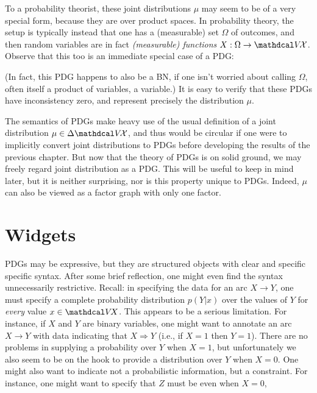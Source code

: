 To a probability theorist, these joint distributions $\mu$ may seem to be of a very special form, because they are over product spaces. 
In probability theory, the setup is typically instead that one has a (measurable) set $\Omega$ of outcomes, and then random variables are in fact \emph{(measurable) functions} $X : \Omega \to \V\!\X$. 
Observe that this too is an immediate special case of a PDG:
%
\begin{center}
\end{center}
%
(In fact, this PDG happens to also be a BN, if one isn't worried about calling $\Omega$, often itself a product of variables, a variable.)
It is easy to verify that these PDGs have inconsistency zero, and represent precisely the distribution $\mu$. 

The semantics of PDGs 
    make heavy use of the usual definition of a joint distribution $\mu \in \Delta \V\!\X$, and thus would be circular if one were to implicitly convert joint distributions to PDGs before developing the results of the previous chapter. 
But now that the theory of PDGs is on solid ground, we may freely regard joint distribution as a PDG. 
This will be useful to keep in mind later, but it is neither surprising, nor is this property unique to PDGs. 
Indeed, $\mu$ can also be viewed as a factor graph with only one factor. 

\section{Widgets}

PDGs may be expressive, but they are structured objects with clear and specific specific syntax.
After some brief reflection, one might even find the syntax unnecessarily restrictive. 
Recall: in specifying the data for an arc $X \to Y$, one must specify a complete probability distribution $p(Y | x)$ over the values of $Y$ for \emph{every} value $x \in \V\!X$. 
This appears to be a serious limitation.
For instance, if $X$ and $Y$ are binary variables, one might want to 
annotate an arc $X \to Y$ with data indicating that $X \Rightarrow Y$
    (i.e., if $X=1$ then $Y=1$).
There are no problems in supplying a probability over $Y$ when $X{=}1$,
but unfortunately we also seem to be on the hook to provide
    a distribution over $Y$ when $X{=}0$. 
One might also want to indicate not a probabilistic information, but a constraint.
For instance, one might want to specify that $Z$ must be even when $X{=}0$, 


